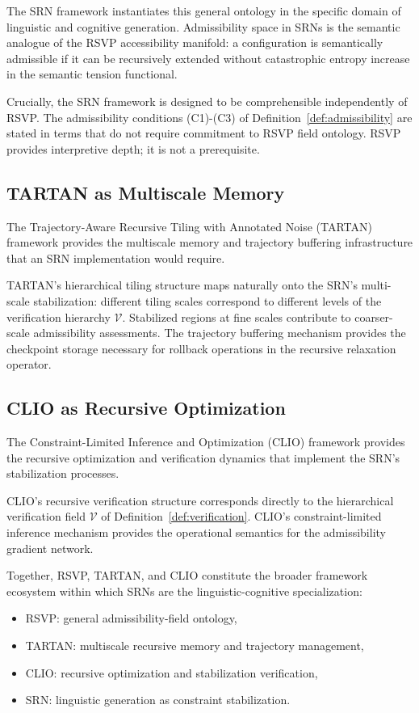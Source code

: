 \documentclass[11pt, a4paper]{article}
\theoremstyle{srn}
\theoremstyle{srnremark}
\begin{document}
The SRN framework instantiates this general ontology in the specific
domain of linguistic and cognitive generation.
Admissibility space in SRNs is the semantic analogue of the RSVP
accessibility manifold: a configuration is semantically admissible if
it can be recursively extended without catastrophic entropy increase
in the semantic tension functional.

Crucially, the SRN framework is designed to be comprehensible
independently of RSVP.
The admissibility conditions (C1)-(C3) of
Definition~\ref{def:admissibility} are stated in terms that do not
require commitment to RSVP field ontology.
RSVP provides interpretive depth; it is not a prerequisite.

\subsection{TARTAN as Multiscale Memory}

The Trajectory-Aware Recursive Tiling with Annotated Noise (TARTAN)
framework provides the multiscale memory and trajectory buffering
infrastructure that an SRN implementation would require.

TARTAN's hierarchical tiling structure maps naturally onto the SRN's
multi-scale stabilization: different tiling scales correspond to
different levels of the verification hierarchy $\mathcal{V}$.
Stabilized regions at fine scales contribute to coarser-scale
admissibility assessments.
The trajectory buffering mechanism provides the checkpoint storage
necessary for rollback operations in the recursive relaxation operator.

\subsection{CLIO as Recursive Optimization}

The Constraint-Limited Inference and Optimization (CLIO) framework
provides the recursive optimization and verification dynamics that
implement the SRN's stabilization processes.

CLIO's recursive verification structure corresponds directly to the
hierarchical verification field $\mathcal{V}$ of
Definition~\ref{def:verification}.
CLIO's constraint-limited inference mechanism provides the operational
semantics for the admissibility gradient network.

Together, RSVP, TARTAN, and CLIO constitute the broader framework
ecosystem within which SRNs are the linguistic-cognitive specialization:
\begin{itemize}
  \item RSVP: general admissibility-field ontology,
  \item TARTAN: multiscale recursive memory and trajectory management,
  \item CLIO: recursive optimization and stabilization verification,
  \item SRN: linguistic generation as constraint stabilization.
\end{itemize}
\end{document}
